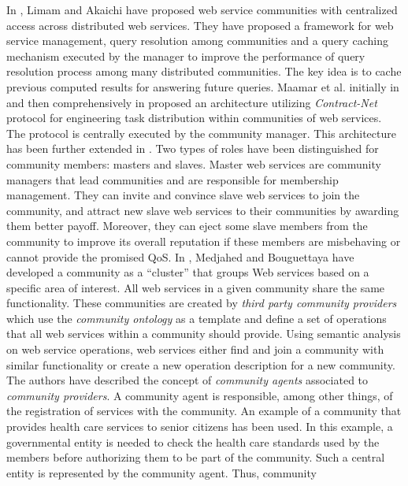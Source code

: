 \documentclass[11pt,onecolumn]{IEEEtran}
\begin{document}
{In \cite{managing-hela-jalel}, Limam and Akaichi have proposed web
service communities with centralized access across distributed web
services. They have proposed a framework for web service
management, query resolution among communities and a query caching
mechanism executed by the manager to improve the performance of
query resolution process among many distributed communities. The
key idea is to cache previous computed results for answering
future queries. Maamar et al. initially in \cite{conf/webist/MaamarLBTS07} and
then comprehensively in \cite{DBLP:journals/ijebr/MaamarSTBB09}
proposed an architecture utilizing \emph{Contract-Net} protocol
for engineering task distribution within communities of web
services. The protocol is centrally executed by the community
manager. This architecture has been further extended in
\cite{CSTintercommunity, conf/IEEEscc/BenharrefSBB11,
conf/IEEEscc/KhosravifarBMMT10, conf/aina/LimTM11}. Two types of
roles have been distinguished for community members: masters and
slaves. Master web services are community managers that lead
communities and are responsible for membership management. They
can invite and convince slave web services to join the community,
and attract new slave web services to their communities by
awarding them better payoff. Moreover, they can eject some slave
members from the community to improve its overall reputation if
these members are misbehaving or cannot provide the promised QoS. 
In \cite{Medjahed05adynamic}, Medjahed and Bouguettaya have
developed a community as a ``cluster'' that groups Web services
based on a specific area of interest. All web services in a given
community share the same functionality. These communities are
created by \emph{third party community providers} which use the
\emph{community ontology} as a template and define a set of
operations that all web services within a community should
provide. Using semantic analysis on web service operations, web
services either find and join a community with similar
functionality or create a new operation description for a new
community. The authors have described the concept of
\emph{community agents} associated to \emph{community providers}.
A community agent is responsible, among other things, of the
registration of services with the community. An example of a
community that provides health care services to senior citizens
has been used. In this example, a governmental entity is needed to
check the health care standards used by the members before
authorizing them to be part of the community. Such a central
entity is represented by the community agent. Thus, community
}
\end{document}
